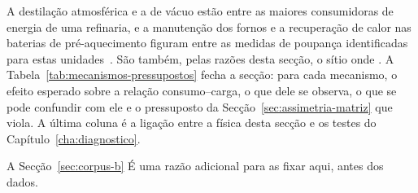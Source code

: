 A destilação atmosférica e a de vácuo estão entre as maiores consumidoras de
energia de uma refinaria, e a manutenção dos fornos e a recuperação de calor
nas baterias de pré-aquecimento figuram entre as medidas de poupança
identificadas para estas unidades~\cite{WorrellGalitsky2005}. São também, pelas razões desta secção, o sítio onde . A Tabela~\ref{tab:mecanismos-pressupostos} fecha a secção: para cada
mecanismo, o efeito esperado sobre a relação consumo--carga, o que dele se
observa, o que se pode confundir com ele e o pressuposto da
Secção~\ref{sec:assimetria-matriz} que viola. A última coluna é a ligação
entre a física desta secção e os testes do Capítulo~\ref{cha:diagnostico}.

A Secção~\ref{sec:corpus-b}  É uma razão adicional para as fixar
aqui, antes dos dados.

